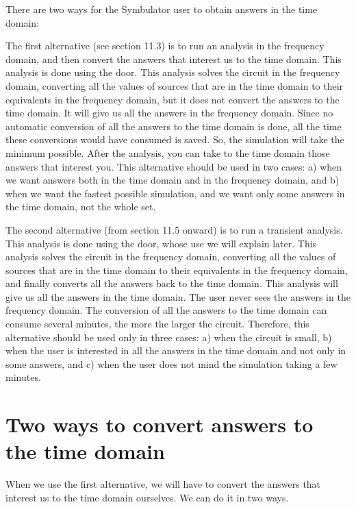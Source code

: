 There are two ways for the Symbulator user to obtain answers in the
time domain:

The first alternative (see section 11.3) is to run an analysis in
the frequency domain, and then convert the answers that interest us
to the time domain. This analysis is done using the
 door. This analysis solves the circuit in the
frequency domain, converting all the values of sources that are in
the time domain to their equivalents in the frequency domain, but it
does not convert the answers to the time domain. It will give us all
the answers in the frequency domain. Since no automatic conversion
of all the answers to the time domain is done, all the time these
conversions would have consumed is saved. So, the simulation will
take the minimum possible. After the analysis, you can take to the
time domain those answers that interest you. This alternative should
be used in two cases: a) when we want answers both in the time
domain and in the frequency domain, and b) when we want the fastest
possible simulation, and we want only some answers in the time
domain, not the whole set.

The second alternative (from section 11.5 onward) is to run a
transient analysis. This analysis is done using the
 door, whose use we will explain later. This
analysis solves the circuit in the frequency domain, converting all
the values of sources that are in the time domain to their
equivalents in the frequency domain, and finally converts all the
answers back to the time domain. This analysis will give us all the
answers in the time domain. The user never sees the answers in the
frequency domain. The conversion of all the answers to the time
domain can consume several minutes, the more the larger the circuit.
Therefore, this alternative should be used only in three cases: a)
when the circuit is small, b) when the user is interested in all the
answers in the time domain and not only in some answers, and c) when
the user does not mind the simulation taking a few minutes.

\section{Two ways to convert answers to the time domain}

When we use the first alternative, we will have to convert the
answers that interest us to the time domain ourselves. We can do it
in two ways.

